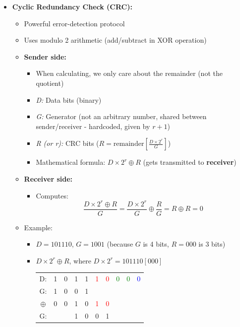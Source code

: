 \documentclass{article}
\begin{document}
\begin{itemize}
    \item \textbf{Cyclic Redundancy Check (CRC):}
    \begin{itemize}
        \item Powerful error-detection protocol
        \item Uses modulo 2 arithmetic (add/subtract in XOR operation)
        \item \textbf{Sender side:}
        \begin{itemize}
            \item When calculating, we only care about the remainder (not the quotient)
            \item \textit{D:} Data bits (binary)
            \item \textit{G:} Generator (not an arbitrary number, shared between sender/receiver
            - hardcoded, given by $r+1$)
            \item \textit{R (or r):} CRC bits ($R=\text{remainder}[\frac{D\times2^r}{G}]$)
            \item Mathematical formula: $D\times2^r\oplus R$ (gets transmitted to \textbf{receiver})
        \end{itemize}
        \item \textbf{Receiver side:}
        \begin{itemize}
            \item Computes: 
            \[
            \frac{D\times2^r\oplus R}{G}=\frac{D\times2^r}{G}\oplus\frac{R}{G}=R\oplus R=0
            \]
        \end{itemize}
        \item Example:
        \begin{itemize}
            \item $D=101110$, $G=1001$ (because $G$ is 4 bits, $R=000$ is 3 bits)
            \item $D\times2^r\oplus R$, where $D\times2^r=101110[000]$
            \begin{center}
                \begin{tabular}{cccccccccc}
                    D: & 1 & 0 & 1 & 1 & \textcolor{red}1 & \textcolor{red}0 & \textcolor{green}0 & \textcolor{green}0 & \textcolor{blue}0 \\
                    G: & 1 & 0 & 0 & 1 \\
                    \hline
                    $\oplus$ & 0 & 0 & 1 & 0 & \textcolor{red}1 & \textcolor{red}0 \\
                    G: & & & 1 & 0 & 0 & 1 \\

\end{tabular}
\end{center}
\end{itemize}
\end{itemize}
\end{itemize}
\end{document}

